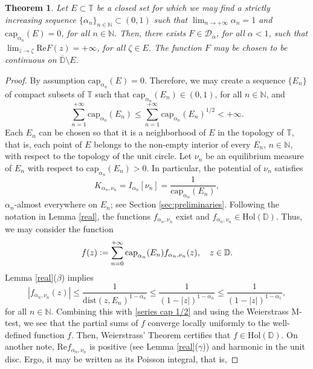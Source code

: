 \documentclass[12pt]{amsart}
\newtheorem{theorem}{Theorem}[section]
\theoremstyle{definition}\newtheorem{remark}[theorem]{Remark}
\theoremstyle{definition}\newtheorem{example}[theorem]{Example}
\theoremstyle{definition}\newtheorem{definition}{Definition}
\numberwithin{equation}{section}
\newcommand\Hol{{\mathrm{Hol}(\mathbb D)}}
\newcommand\cD{{\mathcal D}}
\newcommand\DD{{\mathbb D}}
\newcommand\TT{{\mathbb T}}
\begin{document}
\begin{theorem}\label{construction of function1}
Let $E\subset \TT$ be a closed set for which we may find a strictly increasing sequence $\{\alpha_n\}_{n\in \mathbb N}\subset (0,1)$ such that $\lim_{n\to+\infty}\alpha_n=1$ and $\mathrm{cap}_{\alpha_n}(E)=0$, for all $n\in \mathbb{N}$. Then, there exists $F\in \cD_\alpha$, for all $\alpha<1$, such that $\lim_{z\rightarrow \zeta}\mathrm{Re}F(z)=+\infty$, for all $\zeta\in E$. The function $F$ may be chosen to be continuous on $\overline{\DD}\setminus E$.
\end{theorem}
\begin{proof}
By assumption $\mathrm{cap}_{\alpha_n}(E)=0$. Therefore, we may create a sequence $\{E_n\}$ of compact subsets of $\TT$ such that $\mathrm{cap}_{\alpha_n}(E_n)\in(0,1)$, for all $n\in \mathbb{N}$, and
\begin{equation}\label{series cap 1/2}
\sum_{n=1}^{+\infty}\mathrm{cap}_{\alpha_n}(E_n)\le\sum_{n=1}^{+\infty}\mathrm{cap}_{\alpha_n}(E_n)^{1/2}<+\infty.
\end{equation}
Each $E_n$ can be chosen so that it is a neighborhood of $E$ in the topology of $\TT$, that is, each point of $E$ belongs to the non-empty interior of every $E_n$, $n\in\mathbb{N}$, with respect to the topology of the unit circle. Let $\nu_n$ be an equilibrium measure of $E_n$ with respect to $\mathrm{cap}_{\alpha_n}(E_n)>0$. In particular, the potential of $\nu_n$ satisfies 
\begin{equation}\label{K I cap}
K_{\alpha_n,\nu_n}=I_{\alpha_n}[\nu_n]=\frac{1}{\mathrm{cap}_{\alpha_n}(E_n)},   
\end{equation}
$\alpha_n$-almost everywhere on $E_n$; see Section \ref{sec:preliminaries}. Following the notation in Lemma \ref{real}, the functions $f_{\alpha_n,\nu_n}$ exist and $f_{\alpha_n,\nu_n}\in \Hol$. Thus, we may consider the function
\begin{equation*}
 f(z)\vcentcolon=\sum_{n=0}^{+\infty}\mathrm{cap}_{\alpha_n}(E_n)f_{\alpha_n,\nu_n}(z), \quad z\in \DD.   
\end{equation*}
Lemma \ref{real}\textup{($\beta$)} implies 
\begin{equation*}
    |f_{\alpha_n,\nu_n}(z)|\le \frac{1}{\mathrm{dist}(z,E_n)^{1-\alpha_n}}\le \frac{1}{(1-|z|)^{1-\alpha_n}}\le \frac{1}{(1-|z|)^{1-\alpha_1}},
\end{equation*}
for all $n\in\mathbb{N}$. Combining this with \eqref{series cap 1/2} and using the Weierstrass M-test, we see that the partial sums of $f$ converge locally uniformly to the well-defined function $f$. Then, Weierstrass' Theorem certifies that $f\in \Hol$. On another note, $\mathrm{Re}f_{\alpha_n,\nu_n}$ is positive (see Lemma \ref{real}\textup{($\gamma$)}) and harmonic in the unit disc. Ergo, it may be written as its Poisson integral, that is,

\end{proof}
\end{document}
